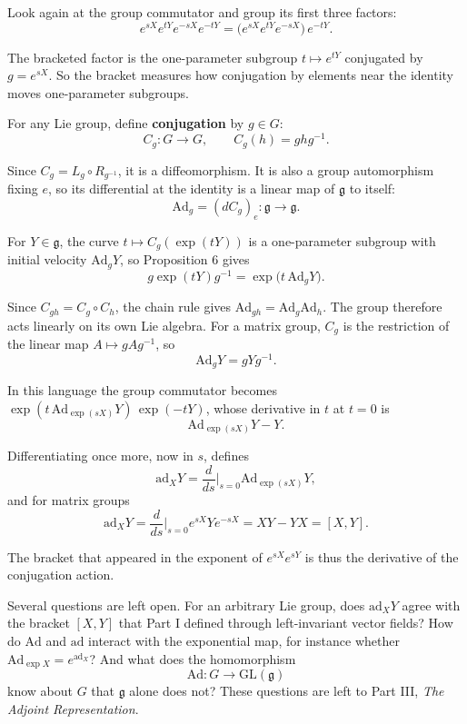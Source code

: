 \documentclass[11pt]{article}
\begin{document}
Look again at the group commutator and group its first three factors:
\[
e^{sX} e^{tY} e^{-sX} e^{-tY} = \bigl(e^{sX} e^{tY} e^{-sX}\bigr)\, e^{-tY}.
\]

The bracketed factor is the one-parameter subgroup $t \mapsto e^{tY}$ conjugated by $g = e^{sX}$. So the bracket measures how conjugation by elements near the identity moves one-parameter subgroups.

For any Lie group, define \textbf{conjugation} by $g \in G$:
\[
C_g : G \to G, \qquad C_g(h) = g h g^{-1}.
\]

Since $C_g = L_g \circ R_{g^{-1}}$, it is a diffeomorphism. It is also a group automorphism fixing $e$, so its differential at the identity is a linear map of $\mathfrak{g}$ to itself:
\[
\mathrm{Ad}_g = (dC_g)_e : \mathfrak{g} \to \mathfrak{g}.
\]

For $Y \in \mathfrak{g}$, the curve $t \mapsto C_g(\exp(tY))$ is a one-parameter subgroup with initial velocity $\mathrm{Ad}_g Y$, so Proposition 6 gives
\[
g \exp(tY) g^{-1} = \exp\bigl(t\, \mathrm{Ad}_g Y\bigr).
\]

Since $C_{gh} = C_g \circ C_h$, the chain rule gives $\mathrm{Ad}_{gh} = \mathrm{Ad}_g \mathrm{Ad}_h$. The group therefore acts linearly on its own Lie algebra. For a matrix group, $C_g$ is the restriction of the linear map $A \mapsto gAg^{-1}$, so
\[
\mathrm{Ad}_g Y = g Y g^{-1}.
\]

In this language the group commutator becomes $\exp(t\,\mathrm{Ad}_{\exp(sX)} Y)\, \exp(-tY)$, whose derivative in $t$ at $t = 0$ is
\[
\mathrm{Ad}_{\exp(sX)} Y - Y.
\]

Differentiating once more, now in $s$, defines
\[
\mathrm{ad}_X Y = \frac{d}{ds}\Big|_{s=0} \mathrm{Ad}_{\exp(sX)} Y,
\]
and for matrix groups
\[
\mathrm{ad}_X Y = \frac{d}{ds}\Big|_{s=0} e^{sX} Y e^{-sX} = XY - YX = [X, Y].
\]

The bracket that appeared in the exponent of $e^{sX}e^{sY}$ is thus the derivative of the conjugation action.

Several questions are left open. For an arbitrary Lie group, does $\mathrm{ad}_X Y$ agree with the bracket $[X, Y]$ that Part I defined through left-invariant vector fields? How do $\mathrm{Ad}$ and $\mathrm{ad}$ interact with the exponential map, for instance whether $\mathrm{Ad}_{\exp X} = e^{\mathrm{ad}_X}$? And what does the homomorphism
\[
\mathrm{Ad} : G \to \mathrm{GL}(\mathfrak{g})
\]
know about $G$ that $\mathfrak{g}$ alone does not? These questions are left to Part III, \emph{The Adjoint Representation}.
\end{document}
